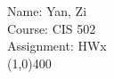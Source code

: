 \documentclass[letter,12pt]{article}
\begin{document}
Name: Yan, Zi \\
Course: CIS 502 \\
Assignment: HWx \\
\line(1,0){400}
\end{document}
